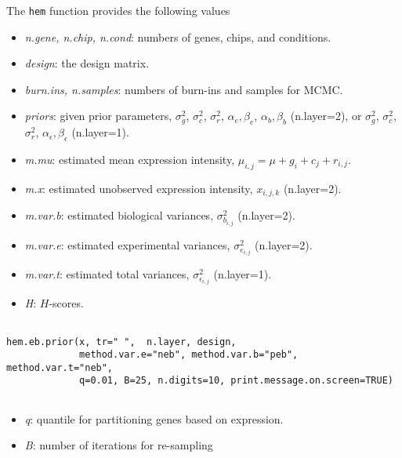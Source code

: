 \documentclass[12pt]{article}
\newcommand{\Rfunction}[1]{{\texttt{#1}}}
\newcommand{\Rfunarg}[1]{{\textit{#1}}}
\begin{document}
\null \vspace{0.1in}
\noindent The \Rfunction{hem} function provides the following values
\begin{itemize}
\item{\Rfunarg{n.gene, n.chip, n.cond}}: numbers of genes, chips, and conditions.
\item{\Rfunarg{design}}: the design matrix. 
\item{\Rfunarg{burn.ins, n.samples}}: numbers of burn-ins and samples for MCMC. 
\item{\Rfunarg{priors}}: given prior parameters, $\sigma^2_g$, $\sigma^2_c$, $\sigma^2_r$,
 $\alpha_e,\beta_e$, $\alpha_b,\beta_b$ (n.layer=2),
 or $\sigma^2_g$, $\sigma^2_c$, $\sigma^2_r$, $\alpha_\epsilon,\beta_\epsilon$ (n.layer=1).
\item{\Rfunarg{m.mu}}: estimated mean expression intensity, $\mu_{i,j}=\mu+g_i+c_j+r_{i,j}$.
\item{\Rfunarg{m.x}}: estimated unobserved expression intensity, $x_{i,j,k}$ (n.layer=2).
\item{\Rfunarg{m.var.b}}: estimated biological variances, $\sigma^2_{b_{i,j}}$ (n.layer=2).
\item{\Rfunarg{m.var.e}}: estimated experimental variances, $\sigma^2_{e_{i,j}}$ (n.layer=2).
\item{\Rfunarg{m.var.t}}: estimated total variances, $\sigma^2_{\epsilon_{i,j}}$ (n.layer=1).
\item{\Rfunarg{H}}: $H$-scores.
\end{itemize}




\begin{verbatim}

hem.eb.prior(x, tr=" ",  n.layer, design,
             method.var.e="neb", method.var.b="peb", method.var.t="neb",
             q=0.01, B=25, n.digits=10, print.message.on.screen=TRUE)
       
\end{verbatim}

\begin{itemize}
\item{\Rfunarg{q}}: quantile for partitioning genes based on expression.
\item{\Rfunarg{B}}: number of iterations for re-sampling
\end{itemize}
\end{document}
